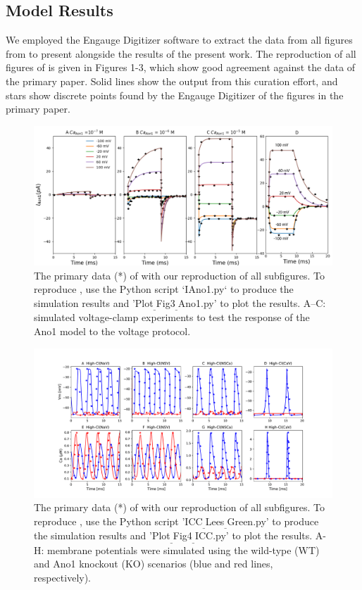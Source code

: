\documentclass[fleqn,10pt]{physiome}
\begin{document}
\subsection{Model Results}
We employed the Engauge Digitizer software \citep{mark_mitchell_2020_3941227} to extract the data from all figures from  \citet{lees2014computational} to present alongside the results of the present work. The reproduction of all figures of \citet{lees2014computational} is given in Figures 1-3, which show good agreement against the data of the primary paper. Solid lines show the output from this curation effort, and stars show discrete points found by the Engauge Digitizer of the figures in the primary paper.
\begin{figure}[ht!]\centering
\includegraphics[width=1.00\linewidth]{Figure3.pdf}
\caption{The primary data (*) of \cite[Figure 3]{lees2014computational} with our reproduction of all subfigures. To reproduce \citet[Figure 3]{lees2014computational}, use the Python script `IAno1.py` to produce the simulation results and 'Plot$_{\_}$Fig3$_{\_}$Ano1.py' to plot the results. A–C: simulated voltage-clamp experiments to test the response of the Ano1 model to the voltage protocol.}
\label{fig:fig3}
\end{figure}
\newpage
\begin{figure}[ht!]%
\hspace*{-2.6cm} \includegraphics[scale=0.55]{Figure4.pdf}
\caption{The primary data (*) of \cite[Figure 4]{lees2014computational} with our reproduction of all subfigures. To reproduce \cite[Figure 4]{lees2014computational}, use the Python script 'ICC$_{\_}$Lees$_{\_}$Green.py' to produce the simulation results and 'Plot$_{\_}$Fig4$_{\_}$ICC.py' to plot the results. A-H: membrane potentials were simulated using the wild-type (WT) and Ano1 knockout (KO) scenarios (blue and red lines, respectively).}
\label{fig:fig4}
\end{figure}
\end{document}
